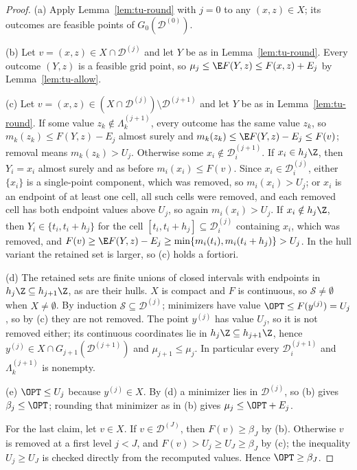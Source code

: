 \begin{proof}
(a) Apply Lemma~\ref{lem:tu-round} with $j=0$ to any $(x,z)\in X$; its
outcomes are feasible points of $G_0(\mathcal D^{(0)})$.

(b) Let $v=(x,z)\in X\cap\mathcal D^{(j)}$ and let $Y$ be as in
Lemma~\ref{lem:tu-round}. Every outcome $(Y,z)$ is a feasible grid point, so
$\mu_j\le\E F(Y,z)\le F(x,z)+E_j$ by Lemma~\ref{lem:tu-allow}.

(c) Let $v=(x,z)\in(X\cap\mathcal D^{(j)})\setminus\mathcal D^{(j+1)}$ and
let $Y$ be as in Lemma~\ref{lem:tu-round}. If some value
$z_k\notin\Lambda^{(j+1)}_k$, every outcome has the same value $z_k$, so
$m_k(z_k)\le F(Y,z)-E_j$ almost surely and $m_k(z_k)\le\E F(Y,z)-E_j\le F(v)$;
removal means $m_k(z_k)>U_j$. Otherwise some
$x_i\notin\mathcal D^{(j+1)}_i$. If $x_i\in h_j\Z$, then $Y_i=x_i$ almost
surely and as before $m_i(x_i)\le F(v)$. Since $x_i\in\mathcal D^{(j)}_i$,
either $\{x_i\}$ is a single-point component, which was removed, so
$m_i(x_i)>U_j$; or $x_i$ is an endpoint of at least one cell, all such cells
were removed, and each removed cell has both endpoint values above $U_j$, so
again $m_i(x_i)>U_j$. If $x_i\notin h_j\Z$, then $Y_i\in\{t_i,t_i+h_j\}$ for
the cell $[t_i,t_i+h_j]\subseteq\mathcal D^{(j)}_i$ containing $x_i$, which was
removed, and $F(v)\ge\E F(Y,z)-E_j\ge\min\{m_i(t_i),m_i(t_i+h_j)\}>U_j$. In
the hull variant the retained set is larger, so (c) holds a fortiori.

(d) The retained sets are finite unions of closed intervals with endpoints in
$h_j\Z\subseteq h_{j+1}\Z$, as are their hulls. $X$ is compact and $F$ is
continuous, so $\mathcal S\ne\emptyset$ when $X\ne\emptyset$. By induction
$\mathcal S\subseteq\mathcal D^{(j)}$; minimizers have value
$\OPT\le F(y^{(j)})=U_j$, so by (c) they are not removed. The point $y^{(j)}$
has value $U_j$, so it is not removed either; its continuous coordinates lie
in $h_j\Z\subseteq h_{j+1}\Z$, hence $y^{(j)}\in X\cap G_{j+1}(\mathcal D^{(j+1)})$
and $\mu_{j+1}\le\mu_j$. In particular every $\mathcal D^{(j+1)}_i$ and
$\Lambda^{(j+1)}_k$ is nonempty.

(e) $\OPT\le U_j$ because $y^{(j)}\in X$. By (d) a minimizer lies in
$\mathcal D^{(j)}$, so (b) gives $\beta_j\le\OPT$; rounding that minimizer as
in (b) gives $\mu_j\le\OPT+E_j$.

For the last claim, let $v\in X$. If $v\in\mathcal D^{(J)}$, then
$F(v)\ge\beta_J$ by (b). Otherwise $v$ is removed at a first level $j<J$, and
$F(v)>U_j\ge U_J\ge\beta_J$ by (c); the inequality $U_j\ge U_J$ is checked
directly from the recomputed values. Hence $\OPT\ge\beta_J$.
\end{proof}

